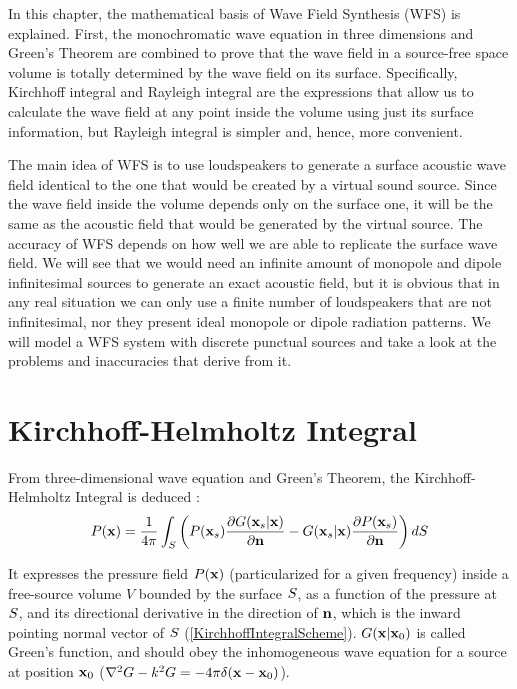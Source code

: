 In this chapter, the mathematical basis of Wave Field Synthesis (WFS) is explained. First, the monochromatic wave equation in three dimensions and Green's Theorem are combined to prove that the wave field in a source-free space volume is totally determined by the wave field on its surface. Specifically, Kirchhoff integral and Rayleigh integral are the expressions that allow us to calculate the wave field at any point inside the volume using just its surface information, but Rayleigh integral is simpler and, hence, more convenient. %

The main idea of WFS is to use loudspeakers to generate a surface acoustic wave field identical to the one that would be created by a virtual sound source. Since the wave field inside the volume depends only on the surface one, it will be the same as the acoustic field that would be generated by the virtual source. The accuracy of WFS depends on how well we are able to replicate the surface wave field. We will see that we would need an infinite amount of monopole and dipole infinitesimal sources to generate an exact acoustic field, but it is obvious that in any real situation we can only use a finite number of loudspeakers that are not infinitesimal, nor they present ideal monopole or dipole radiation patterns. We will model a WFS system with discrete punctual sources and take a look at the problems and inaccuracies that derive from it.

\section{Kirchhoff-Helmholtz Integral}
From three-dimensional wave equation and Green's Theorem, the Kirchhoff-Helmholtz Integral is deduced \cite{BerkhoutSeismic} \cite{Verheijen}:
\begin{equation}
P(\PosTheo) = \frac{1}{4\pi} \int_{S} \left(P(\PosTheo[surface])\frac{\partial G(\PosTheo[surface]\vert \PosTheo)}{\partial \mathbf{n}} - G(\PosTheo[surface]\vert \PosTheo) \frac{\partial P(\PosTheo[surface])}{\partial \mathbf{n}} \right) dS
\label{KirchhoffHelmholtz}
\end{equation}

It expresses the pressure field $\Field(\PosTheo)$ (particularized for a given frequency) inside a free-source volume $V$ bounded by the surface $S$, as a function of the pressure at $S$, and its directional derivative in the direction of $\mathbf{n}$, which is the inward pointing normal vector of $S$ (\autoref{KirchhoffIntegralScheme}). $G(\PosTheo \vert \PosTheo_0)$ is called Green's function, and should obey the inhomogeneous wave equation for a source at position $\PosTheo_0$ ($\nabla^2 G - k^2 G = -4\pi\delta(\PosTheo - \PosTheo_0)$).

